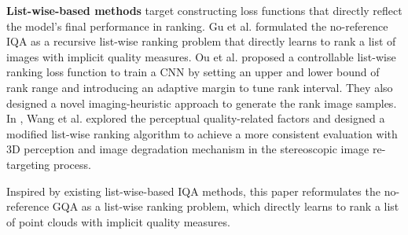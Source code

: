 \textbf{List-wise-based methods} target constructing loss functions that directly reflect the model's final performance in ranking. 
Gu et al. \citep{Guj19} formulated the no-reference IQA as a recursive list-wise ranking problem that directly learns to rank a list of images with implicit quality measures.
Ou et al. \citep{oufz21} proposed a controllable list-wise ranking loss function to train a CNN by setting an upper and lower bound of rank range and introducing an adaptive margin to tune rank interval. 
They also designed a novel imaging-heuristic approach to generate the rank image samples.
In \citep{Wangxj22}, Wang et al. explored the perceptual quality-related factors and designed a modified list-wise ranking algorithm to achieve a more consistent evaluation with 3D perception and image degradation mechanism in the stereoscopic image re-targeting process.

Inspired by existing list-wise-based IQA methods, this paper reformulates the no-reference GQA as a list-wise ranking problem, which directly learns to rank a list of point clouds with implicit quality measures.